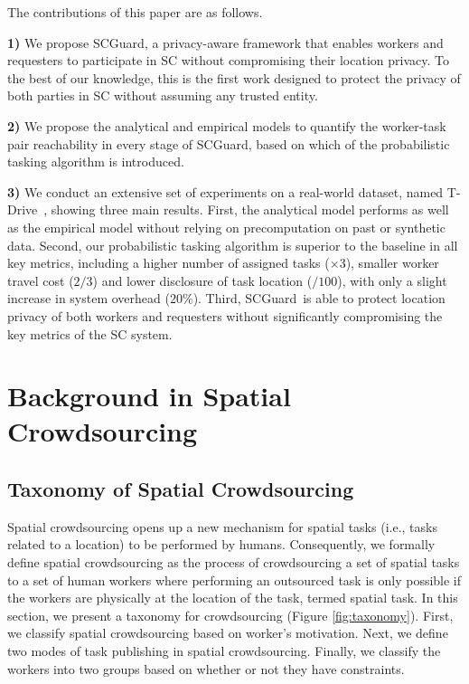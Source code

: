 \documentclass{USC-Thesis}
\newcommand{\SCG}{{SCGuard}}
\numberwithin{equation}{chapter}
\begin{document}
The contributions of this paper are as follows.
\vspace{0.05in}

\noindent \textbf{1)} We propose \SCG, a privacy-aware framework that enables workers and requesters to participate in SC without compromising their location privacy. To the best of our knowledge, this is the first work designed to protect the privacy of both parties in SC without assuming any trusted entity.

\noindent \textbf{2)} We propose the analytical and empirical models to quantify the worker-task pair reachability in every stage of \SCG, based on which of the probabilistic tasking algorithm is introduced.

\noindent \textbf{3)} We conduct an extensive set of experiments on a real-world dataset, named T-Drive~\cite{yuan2010t}, showing three main results. First, the analytical model performs as well as the empirical model without relying on precomputation on past or synthetic data. Second, our probabilistic tasking algorithm is superior to the baseline in all key metrics, including a higher number of assigned tasks ($\times 3$), smaller worker travel cost ($2/3$) and lower disclosure of task location ($/100$), with only a slight increase in system overhead ($20\%$). Third, \SCG\ is able to protect location privacy of both workers and requesters without significantly compromising the key metrics of the SC system.

\chapter{Background in Spatial Crowdsourcing}
\section{Taxonomy of Spatial Crowdsourcing}
\label{sec:taxonomy}
Spatial crowdsourcing opens up a new mechanism for spatial tasks (i.e., tasks related to a location) to be performed by humans. Consequently, we formally define spatial crowdsourcing as the process of crowdsourcing a set of spatial tasks to a set of human workers where performing an outsourced task is only possible if the workers are physically at the location of the task, termed spatial task. In this section, we present a taxonomy for crowdsourcing (Figure \ref{fig:taxonomy}). First, we classify spatial crowdsourcing based on worker's motivation. Next, we define two modes of task publishing in spatial crowdsourcing. Finally, we classify the workers into two groups based on whether or not they have constraints.
\end{document}
